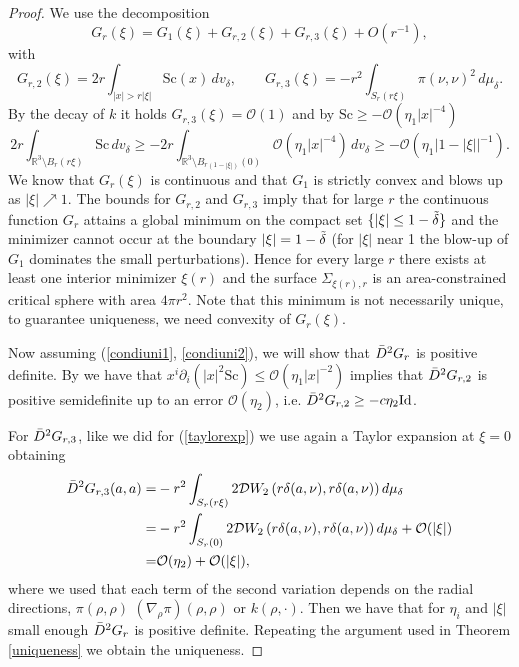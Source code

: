 \documentclass[12pt,a4paper]{amsart}
\theoremstyle{plain}
\theoremstyle{definition}
\begin{document}
\begin{proof}We use the decomposition 
\begin{equation}\label{Gr-split-proof}
G_r(\xi)=G_1(\xi)+G_{r,2}(\xi)+G_{r,3}(\xi)+O(r^{-1}),
\end{equation}
with
\[
G_{r,2}(\xi)=2r\int_{|x|>r|\xi|}\mathrm{Sc}(x)\,dv_\delta,\qquad
G_{r,3}(\xi)=-r^2\int_{S_r(r\xi)}\pi(\nu,\nu)^2\,d\mu_\delta.
\]
By the decay of $k$ it holds $ G_{r,3}(\xi)= \mathcal{O}(1)  $ and by $ \mathrm{Sc} \geq -\mathcal{O}(\eta_1|x|^{-4}) $
\[
2 r \int_{\mathbb{R}^3 \setminus B_r(r \xi)} \mathrm{Sc} \, dv_\delta \geq -2 r \int_{\mathbb{R}^3 \setminus B_{r(1 - |\xi|)}(0)} \mathcal{O}(\eta_1|x|^{-4})  \, dv_\delta \geq -\mathcal{O}(\eta_1 |1 - |\xi||^{-1}).
\]
We know that $G_r(\xi)$ is continuous  and that \(G_1\) is strictly convex and blows up as \(|\xi|\nearrow1\).  The bounds for $ G_{r,2}$ and $ G_{r,3}$  imply that
for large \(r\) the continuous function \(G_r\) attains a global minimum on the compact set
\(\{|\xi|\le 1-\Tilde{\delta}\}\) and the minimizer cannot occur at the boundary \( |\xi|=1-\Tilde{\delta}\)
(for \(|\xi|\) near 1 the blow-up of \(G_1\) dominates the small perturbations). Hence for every
large \(r\) there exists at least one interior minimizer \(\xi(r)\) and the  surface \(\Sigma_{\xi(r),r}\) is an area-constrained critical sphere with area \(4\pi r^2\).  Note that this minimum is not necessarily unique, to guarantee uniqueness, we need convexity of $G_r(\xi)$.

Now assuming (\ref{condiuni1}, \ref{condiuni2}), we will show that $\Bar{D}^2 G_r$ is positive definite. By \cite[Lemma 20, Corollary 21]{willcen}  we have that  $ x^i \partial_i (|x|^2 \mathrm{Sc}) \leq \mathcal{O} (\eta_1 |x|^{-2})$ implies that $\Bar{D}^2G_{r,2}$ is positive semidefinite up to an error $ \mathcal{O}(\eta_2 )$, i.e.  $\Bar{D}^2G_{r,2}\geq -c\eta_2  \text{Id}$. 


For  $ \Bar{D}^2G_{r,3}$,  like we did for (\ref{taylorexp}) we use again a Taylor expansion at $\xi=0$ obtaining
\begin{equation}
    \begin{split}
    \Bar{D}^2G_{r,3}(a,a) =&   -  r^2\int_{S_{r}(r\xi)}    2\mathcal{D}W_2\left(r \delta( a, \nu ), r \delta( a, \nu ) \right) d\mu_\delta  \\
    =&   -  r^2\int_{S_{r}(0)}   2 \mathcal{D}W_2\left(r \delta( a, \nu ), r \delta( a, \nu ) \right) d\mu_\delta  + \mathcal{O}(|\xi| )\\
    =&\mathcal{O}(\eta_2 ) + \mathcal{O}(|\xi| ),
    \end{split}
\end{equation}
where we used that each term of the second variation depends on the radial directions,  $\pi(\rho,\rho)$ $(\nabla_\rho \pi)(\rho,\rho)$ or $k(\rho,\cdot) $.  Then we have that for $ \eta_i$ and $ |\xi|$ small enough $\Bar{D}^2 G_r$ is positive definite.   Repeating the argument used in Theorem \ref{uniqueness} we obtain the  uniqueness.
\end{proof}
\end{document}
